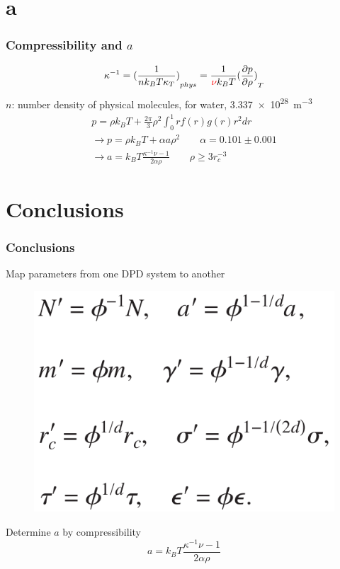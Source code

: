 \documentclass{beamer}
\begin{document}
\section{a}

\begin{frame}
\frametitle{Compressibility and $a$}
\begin{equation*}
\kappa^{-1}={(\frac{1}{nk_BT\kappa_T})}_{phys}=\frac{1}{\textcolor{red}{\nu} k_BT}{(\frac{\partial p}{\partial \rho})}_T
\end{equation*}
$n$: number density of physical molecules, for water, \SI{3.337e28}{m^{-3}}
\begin{gather*}
    p = \rho k_B T + \frac{2\pi}{3}\rho^2 \int_0^1 rf(r)g(r)r^2dr \\
    \rightarrow p = \rho k_B T + \alpha a \rho^2 \qquad \alpha = 0.101 \pm 0.001 \\
    \rightarrow a = k_BT \frac{\kappa^{-1}\nu - 1}{2\alpha \rho} \qquad \rho \geq 3r_c^{-3}
\end{gather*}
\end{frame}

\section{Conclusions}

\begin{frame}
\frametitle{Conclusions}
Map parameters from one DPD system to another
\begin{figure}
\includegraphics[height=.4\textheight]{scaling.png}
\end{figure}
Determine $a$ by compressibility
$$a = k_BT \frac{\kappa^{-1}\nu - 1}{2\alpha \rho}$$
\end{frame}
\end{document}
